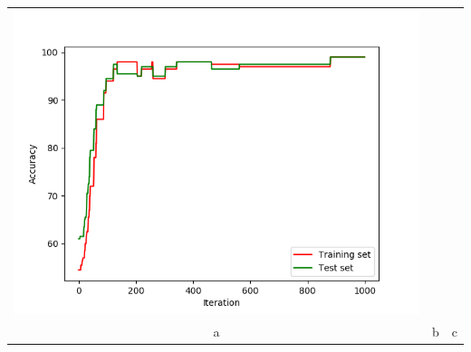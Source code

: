 \documentclass{article}
\begin{document}
\begin{center}
\begin{tabular}{ccc}
\includegraphics[scale=0.2]{learning_curve_sample1} \\
\scriptsize a & \scriptsize b & \scriptsize c\\
\end{tabular}
\end{center}
\end{document}
